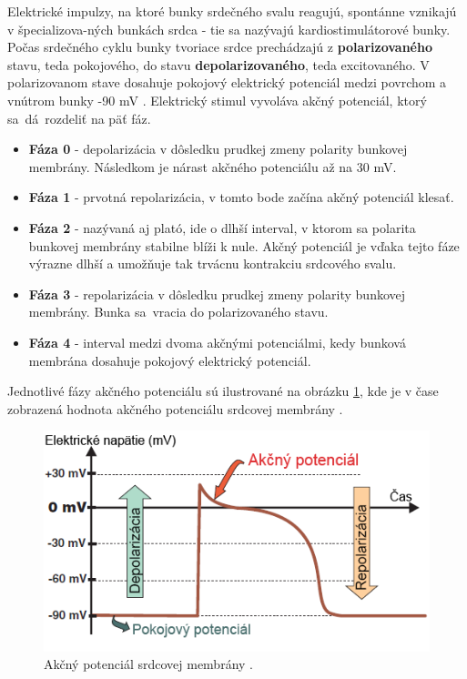  Elektrické impulzy, na ktoré bunky srdečného svalu reagujú, spontánne vznikajú v špecializova-ných bunkách srdca - tie sa nazývajú kardiostimulátorové bunky. Počas srdečného cyklu bunky tvoriace srdce prechádzajú z \textbf{polarizovaného} stavu, teda pokojového, do stavu \textbf{depolarizovaného}, teda excitovaného. V polarizovanom stave dosahuje pokojový elektrický potenciál medzi povrchom a vnútrom bunky -90 mV \cite{Bada2010}. Elektrický stimul vyvoláva akčný potenciál, ktorý sa~dá~rozdeliť na päť fáz.

 \newpage
 
\begin{itemize}
    \item \textbf{Fáza 0} - depolarizácia v dôsledku prudkej zmeny polarity bunkovej membrány. Následkom je nárast akčného potenciálu až na 30 mV.
    \item \textbf{Fáza 1} - prvotná repolarizácia, v tomto bode začína akčný potenciál klesať.
    \item \textbf{Fáza 2} - nazývaná aj plató, ide o dlhší interval, v ktorom sa polarita bunkovej membrány stabilne blíži k nule. Akčný potenciál je vďaka tejto fáze výrazne dlhší a umožňuje tak trvácnu kontrakciu srdcového svalu.
    \item \textbf{Fáza 3} - repolarizácia v dôsledku prudkej zmeny polarity bunkovej membrány. Bunka sa~vracia do polarizovaného stavu.
    \item \textbf{Fáza 4} - interval medzi dvoma akčnými potenciálmi, kedy bunková membrána dosahuje pokojový elektrický potenciál. 
\end{itemize}

Jednotlivé fázy akčného potenciálu sú ilustrované na obrázku \ref{fig:action_potential_voltage}, kde je v čase zobrazená hodnota akčného potenciálu srdcovej membrány \cite{Rooke2021TheEA}\cite{Bada2010}.

\begin{figure}[H]
    \centering
    \includegraphics[scale=0.45]{img/action-potential-voltage.png}
    \caption{Akčný potenciál srdcovej membrány \cite{Blahút_2017}.}
    \label{fig:action_potential_voltage}
\end{figure}


